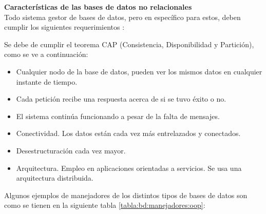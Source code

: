 \textbf{Características de las bases de datos no relacionales} \\
Todo sistema gestor de bases de datos, pero en específico para estos, deben 
cumplir los siguientes requerimientos \cite{inv_storage_data}:

Se debe de cumplir el teorema CAP (Consistencia, Disponibilidad y Partición), 
como se ve a continuación:
\begin{itemize}
	\item Cualquier nodo de la base de datos, pueden ver los mismos datos en 
		cualquier instante de tiempo.
	\item Cada petición recibe una respuesta acerca de si se tuvo éxito o 
		no.
	\item El sistema continúa funcionando a pesar de la falta de mensajes.
	\item Conectividad. Los datos están cada vez más entrelazados y 
		conectados. 
	\item Desestructuración cada vez mayor.
	\item Arquitectura. Empleo en aplicaciones orientadas a servicios. Se 
		usa una arquitectura distribuida.
\end{itemize}

Algunos ejemplos de manejadores de los distintos tipos de bases de datos son 
como se tienen en la siguiente tabla \ref{tabla:bd:manejadores:oop}:

